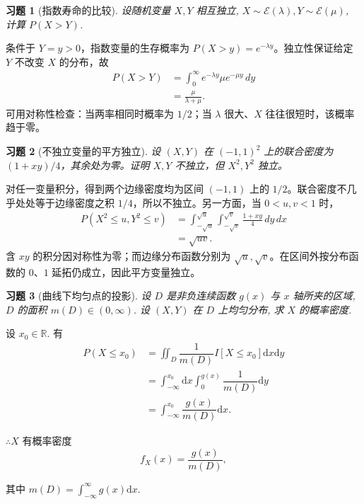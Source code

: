 \documentclass[12pt,fontset=fandol]{ctexart}
\newtheorem{exercise}{习题}[section]
\begin{document}
\begin{exercise}[指数寿命的比较]\label{q:A4.14}
设随机变量 $X,Y$ 相互独立, $X\sim\mathcal{E}(\lambda),Y\sim\mathcal{E}(\mu)$, 计算 $P(X>Y)$.\par{}
\end{exercise}

\begin{solve}\label{a:A4.14}条件于 $Y=y>0$，指数变量的生存概率为 $P(X>y)=e^{-\lambda y}$。独立性保证给定 $Y$ 不改变 $X$ 的分布，故\[\begin{aligned}P(X>Y)&=\int_0^\infty e^{-\lambda y}\mu e^{-\mu y}\,dy\\&=\frac\mu{\lambda+\mu}.\end{aligned}\]可用对称性检查：当两率相同时概率为 $1/2$；当 $\lambda$ 很大、$X$ 往往很短时，该概率趋于零。\end{solve}

\begin{exercise}[不独立变量的平方独立]\label{q:A4.17}
设 $(X,Y)$ 在 $(-1,1)^2$ 上的联合密度为 $(1+xy)/4$，其余处为零。证明 $X,Y$ 不独立，但 $X^2,Y^2$ 独立。\par{}
\end{exercise}

\begin{solve}\label{a:A4.17}对任一变量积分，得到两个边缘密度均为区间 $(-1,1)$ 上的 $1/2$。联合密度不几乎处处等于边缘密度之积 $1/4$，所以不独立。另一方面，当 $0<u,v<1$ 时，\[\begin{aligned}P(X^2\le u,Y^2\le v)&=\int_{-\sqrt u}^{\sqrt u}\int_{-\sqrt v}^{\sqrt v}\frac{1+xy}{4}\,dy\,dx\\&=\sqrt{uv}.\end{aligned}\]含 $xy$ 的积分因对称性为零；而边缘分布函数分别为 $\sqrt u,\sqrt v$。在区间外按分布函数的 $0$、$1$ 延拓仍成立，因此平方变量独立。\end{solve}

\begin{exercise}[曲线下均匀点的投影]\label{q:A4.18}
设 $D$ 是非负连续函数 $g(x)$ 与 $x$ 轴所夹的区域, $D$ 的面积 $m(D)\in(0,\infty)$. 设 $(X,Y)$ 在 $D$ 上均匀分布, 求 $X$ 的概率密度.\par{}
\end{exercise}

\begin{solve}\label{a:A4.18}
    设 $x_0\in\mathbb{R}$. 有
    \begin{align*}
        P(X\leq x_0) & =\iint_D\dfrac{1}{m(D)}I[X\leq x_0]\mathrm{d}x\mathrm{d}y \\
        & =\int_{-\infty}^{x_0}\mathrm{d}x\int_0^{g(x)}\dfrac{1}{m(D)}\mathrm{d}y \\
        & =\int_{-\infty}^{x_0}\dfrac{g(x)}{m(D)}\mathrm{d}x.
    \end{align*}

    $\therefore X$ 有概率密度
    \[f_X(x)=\dfrac{g(x)}{m(D)},\]

    其中 $m(D)=\int_{-\infty}^\infty g(x)\mathrm{d}x$.
\end{solve}
\end{document}
